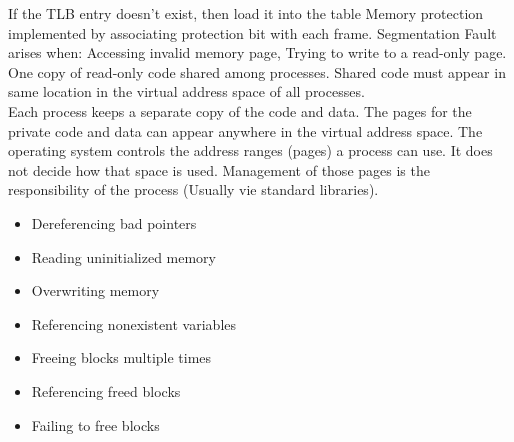 \documentclass[number]{notes}
\begin{document}
\begin{landscape}
\begin{multicols}{3}
If the TLB entry doesn't exist, then load it into the table
Memory protection implemented by associating protection bit with each frame.
Segmentation Fault arises when: Accessing invalid memory page, Trying to write to a read-only page.
One copy of read-only code shared among processes. Shared code must appear in same location in the virtual address space of all processes.\\
Each process keeps a separate copy of the code and data. The pages for the private code and data can appear anywhere in the virtual address space.
The operating system controls the address ranges (pages) a process can use. It does not decide how that space is used. Management of those pages is the responsibility of the process (Usually vie standard libraries).

\begin{itemize}[nolistsep]
    \item Dereferencing bad pointers
    \item Reading uninitialized memory
    \item Overwriting memory
    \item Referencing nonexistent variables
    \item Freeing blocks multiple times
    \item Referencing freed blocks
    \item Failing to free blocks
\end{itemize}


\end{multicols}
\end{landscape}
\end{document}
